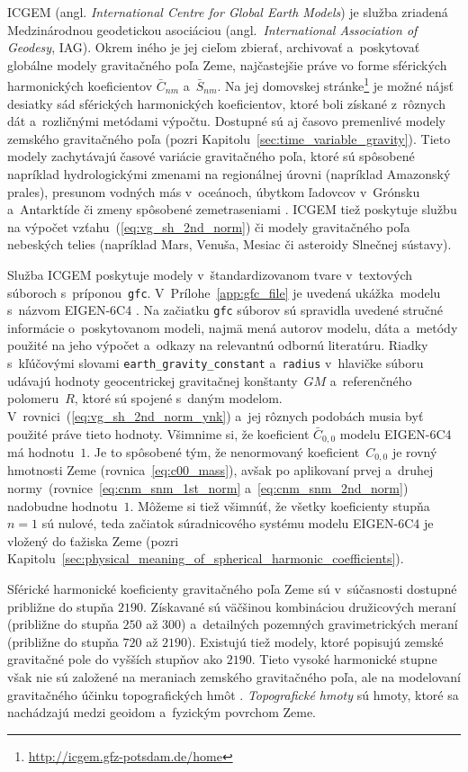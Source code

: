 \documentclass[a4paper, 12pt]{book}
\begin{document}
ICGEM (angl. \emph{International Centre for Global Earth Models}) je služba 
zriadená Medzinárodnou geodetickou asociáciou (angl.~\emph{International 
Association of Geodesy}, IAG).  Okrem iného je jej cieľom zbierať, archivovať 
a~poskytovať globálne modely gravitačného poľa Zeme, najčastejšie práve vo 
forme sférických harmonických koeficientov $\bar{C}_{nm}$ a~$\bar{S}_{nm}$.  Na 
jej domovskej 
stránke\footnote{\label{fn:icgem_link}\url{http://icgem.gfz-potsdam.de/home}} 
je možné nájsť desiatky sád sférických harmonických koeficientov, ktoré boli 
získané z~rôznych dát a~rozličnými metódami výpočtu.  Dostupné sú aj časovo 
premenlivé modely zemského gravitačného poľa (pozri 
Kapitolu~\ref{sec:time_variable_gravity}).  Tieto modely zachytávajú časové 
variácie gravitačného poľa, ktoré sú spôsobené napríklad hydrologickými zmenami 
na regionálnej úrovni (napríklad Amazonský prales), presunom vodných más 
v~oceánoch, úbytkom ľadovcov v~Grónsku a~Antarktíde či zmeny spôsobené 
zemetraseniami \parencite{Wahr2007}.  ICGEM tiež poskytuje službu na výpočet 
vzťahu~(\ref{eq:vg_sh_2nd_norm}) či modely gravitačného poľa nebeských telies 
(napríklad Mars, Venuša, Mesiac či asteroidy Slnečnej sústavy).

Služba ICGEM poskytuje modely v~štandardizovanom tvare v~textových súboroch 
s~príponou~\texttt{gfc}.  V~Prílohe~\ref{app:gfc_file} je uvedená ukážka~modelu 
s~názvom EIGEN-6C4 \parencite{EIGEN-6C4}.  Na začiatku \texttt{gfc} súborov sú 
spravidla uvedené stručné informácie o~poskytovanom modeli, najmä mená autorov 
modelu, dáta a~metódy použité na jeho výpočet a~odkazy na relevantnú odbornú 
literatúru.  Riadky s~kľúčovými slovami \texttt{earth\_gravity\_constant} 
a~\texttt{radius} v~hlavičke súboru udávajú hodnoty geocentrickej gravitačnej 
konštanty~$GM$ a~referenčného polomeru~$R$, ktoré sú spojené s~daným modelom.  
V~rovnici~(\ref{eq:vg_sh_2nd_norm_ynk}) a~jej rôznych podobách musia byť 
použité práve tieto hodnoty.  Všimnime si, že koeficient $\bar{C}_{0,0}$ modelu 
EIGEN-6C4 má hodnotu~$1$.  Je to spôsobené tým, že nenormovaný 
koeficient~$C_{0,0}$ je rovný hmotnosti Zeme (rovnica~\ref{eq:c00_mass}), avšak 
po aplikovaní prvej a~druhej normy~(rovnice~\ref{eq:cnm_snm_1st_norm} 
a~\ref{eq:cnm_snm_2nd_norm}) nadobudne hodnotu~$1$.  Môžeme si tiež všimnúť, že 
všetky koeficienty stupňa~$n = 1$ sú nulové, teda začiatok súradnicového 
systému modelu EIGEN-6C4 je vložený do ťažiska Zeme (pozri 
Kapitolu~\ref{sec:physical_meaning_of_spherical_harmonic_coefficients}).

Sférické harmonické koeficienty gravitačného poľa Zeme sú v~súčasnosti dostupné
približne do stupňa $2190$.  Získavané sú väčšinou kombináciou družicových
meraní (približne do stupňa $250$ až $300$) a~detailných pozemných
gravimetrických meraní (približne do stupňa $720$ až $2190$).  Existujú tiež 
modely, ktoré popisujú zemské gravitačné pole do vyšších stupňov ako $2190$.  
Tieto vysoké harmonické stupne však nie sú založené na meraniach zemského 
gravitačného poľa, ale na modelovaní gravitačného účinku topografických hmôt 
\parencite[napríklad][]{Ince2020}.  \emph{Topografické 
hmoty}\label{def:topographic_masses} sú hmoty, ktoré sa nachádzajú medzi 
geoidom a~fyzickým povrchom Zeme.
\end{document}
